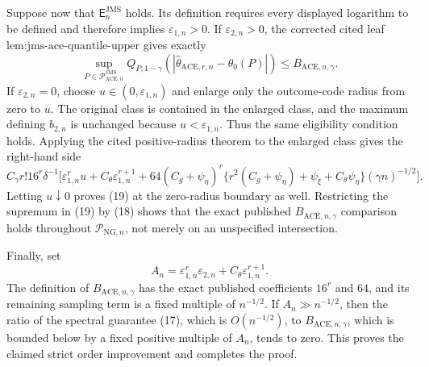 Suppose now that \(\mathsf E_n^{\mathrm{JMS}}\) holds.  Its definition
requires every displayed logarithm to be defined and therefore implies
\(\varepsilon_{1,n}>0\).  If \(\varepsilon_{2,n}>0\), the corrected
cited leaf \(\text{lem:jms-ace-quantile-upper}\) gives exactly
\[
 \sup_{P\in\mathcal P_{\mathrm{ACE},n}^{\mathrm{JMS}}}
 Q_{P,1-\gamma}
 \!\left(|\widehat\theta_{\mathrm{ACE},r,n}-\theta_0(P)|\right)
 \le B_{\mathrm{ACE},n,\gamma}.                         \tag{19}
\]
If \(\varepsilon_{2,n}=0\), choose
\(u\in(0,\varepsilon_{1,n})\) and enlarge only the outcome-code radius
from zero to \(u\).  The original class is contained in the enlarged
class, and the maximum defining \(b_{2,n}\) is unchanged because
\(u<\varepsilon_{1,n}\).  Thus the same eligibility condition holds.
Applying the cited positive-radius theorem to the enlarged class gives
the right-hand side
\[
 C_{\gamma}r!16^r\delta^{-1}
 \Big[\varepsilon_{1,n}^r u+C_{\theta}\varepsilon_{1,n}^{r+1}
 +64(C_g+\psi_{\eta})^r
 \{r^2(C_g+\psi_{\eta})+\psi_{\xi}+C_{\theta}\psi_{\eta}\}
 (\gamma n)^{-1/2}\Big].
\]
Letting \(u\downarrow0\) proves (19) at the zero-radius boundary as
well.  Restricting the supremum in (19) by (18) shows that the exact
published \(B_{\mathrm{ACE},n,\gamma}\) comparison holds throughout
\(\mathcal P_{\mathrm{NG},n}\), not merely on an unspecified
intersection.

Finally, set
\[
 A_n=\varepsilon_{1,n}^r\varepsilon_{2,n}
     +C_{\theta}\varepsilon_{1,n}^{r+1}.
\]
The definition of \(B_{\mathrm{ACE},n,\gamma}\) has the exact published
coefficients \(16^r\) and \(64\), and its remaining sampling term is a
fixed multiple of \(n^{-1/2}\).  If \(A_n\gg n^{-1/2}\), then the ratio
of the spectral guarantee (17), which is \(O(n^{-1/2})\), to
\(B_{\mathrm{ACE},n,\gamma}\), which is bounded below by a fixed positive
multiple of \(A_n\), tends to zero.  This proves the claimed strict
order improvement and completes the proof.
